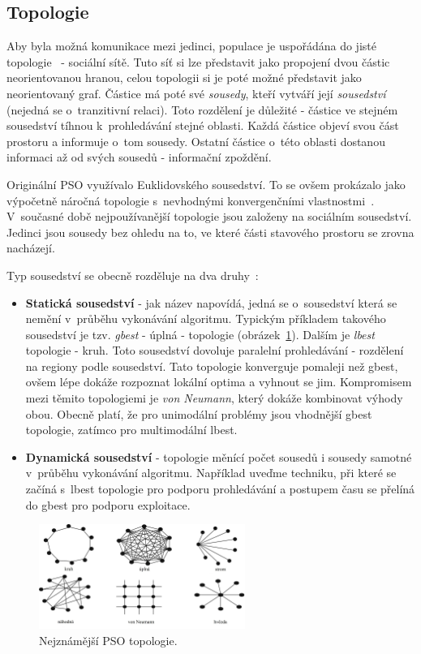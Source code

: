 \subsection{Topologie}
Aby byla možná komunikace mezi jedinci, populace je uspořádána do jisté topologie~\cite{pso_article} - sociální sítě. Tuto síť si lze představit jako propojení dvou částic neorientovanou hranou, celou topologii si je poté možné představit jako neorientovaný graf. Částice má poté své \textit{sousedy}, kteří vytváří její \textit{sousedství} (nejedná se o~tranzitivní relaci). Toto rozdělení je důležité - částice ve stejném sousedství tíhnou k~prohledávání stejné oblasti. Každá částice objeví svou část prostoru a informuje o~tom sousedy. Ostatní částice o~této oblasti dostanou informaci až od svých sousedů - informační zpoždění. 

Originální PSO využívalo Euklidovského sousedství. To se ovšem prokázalo jako výpočetně náročná topologie s~nevhodnými konvergenčními vlastnostmi~\cite{pso_article}. V~současné době nejpoužívanější topologie jsou založeny na sociálním sousedství. Jedinci jsou sousedy bez ohledu na to, ve které části stavového prostoru se zrovna nacházejí. 

Typ sousedství se obecně rozděluje na dva druhy~\cite{pso_article}:

\begin{itemize}
    \item \textbf{Statická sousedství} - jak název napovídá, jedná se o~sousedství která se nemění v~průběhu vykonávání algoritmu. Typickým příkladem takového sousedství je tzv. \textit{gbest} -  úplná - topologie (obrázek~\ref{fg:pso_swarmTopo}). Dalším je \textit{lbest} topologie - kruh. Toto sousedství dovoluje paralelní prohledávání - rozdělení na regiony podle sousedství. Tato topologie konverguje pomaleji než gbest, ovšem lépe dokáže rozpoznat lokální optima a vyhnout se jim. Kompromisem mezi těmito topologiemi je \textit{von Neumann}, který dokáže kombinovat výhody obou. Obecně platí, že pro unimodální problémy jsou vhodnější gbest topologie, zatímco pro multimodální lbest.
    \item \textbf{Dynamická sousedství} - topologie měnící počet sousedů i sousedy samotné v~průběhu vykonávání algoritmu. Například uveďme techniku, při které se začíná s~lbest topologie pro podporu prohledávání a postupem času se přelíná do gbest pro podporu exploitace.
\end{itemize}


\begin{figure}[H]
	\centering
	\includegraphics[width=0.6\textwidth]{obrazky-figures/psoTopo.jpg}
	\caption{Nejznámější PSO topologie.}
	\label{fg:pso_swarmTopo}
\end{figure}


